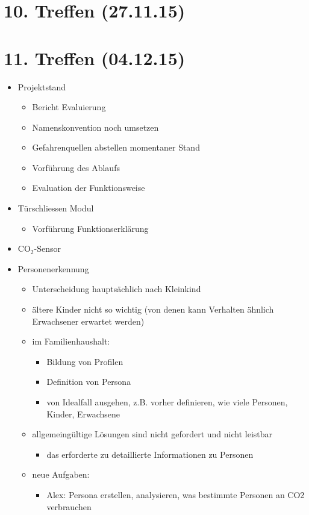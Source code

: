 \section{10. Treffen (27.11.15)}

\section{11. Treffen (04.12.15)}
\begin{itemize}
	\item Projektstand
	\begin{itemize}
		\item Bericht Evaluierung
		\item Namenskonvention noch umsetzen
		\item Gefahrenquellen abstellen momentaner Stand
		\item Vorführung des Ablaufs
		\item Evaluation der Funktionsweise
	\end{itemize}

	\item Türschliessen Modul
	\begin{itemize}
		\item Vorführung Funktionserklärung
	\end{itemize}

	\item CO$_2$-Sensor
	\item Personenerkennung
	\begin{itemize}
		\item Unterscheidung hauptsächlich nach Kleinkind
		\item ältere Kinder nicht so wichtig (von denen kann Verhalten ähnlich Erwachsener erwartet werden)
		\item im Familienhaushalt:
		\begin{itemize}
			\item Bildung von Profilen
			\item Definition von Persona
			\item von Idealfall ausgehen, z.B. vorher definieren, wie viele Personen, Kinder, Erwachsene
		\end{itemize}
	\item allgemeingültige Lösungen sind nicht gefordert und nicht leistbar
		\begin{itemize}
			\item das erforderte zu detaillierte Informationen zu Personen
		\end{itemize}
	\item neue Aufgaben:
		\begin{itemize}
			\item Alex: Persona erstellen, analysieren, was bestimmte Personen an CO2 verbrauchen	
		\end{itemize}
	\end{itemize}


\end{itemize}
